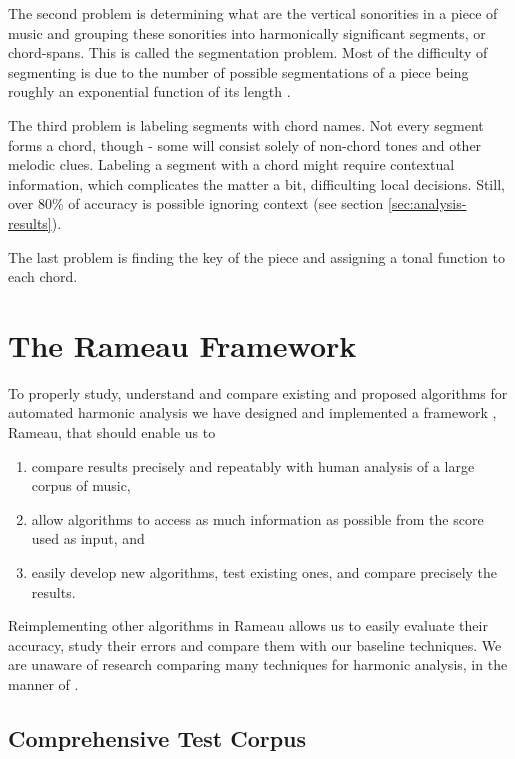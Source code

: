 \documentclass{article}
\begin{document}
The second problem is determining what are the vertical sonorities in
a piece of music and grouping these sonorities into harmonically
significant segments, or chord-spans. This is called the segmentation
problem. Most of the difficulty of segmenting is due to the number of
possible segmentations of a piece being roughly an exponential
function of its length \cite{pardo02:algorithms}.

The third problem is labeling segments with chord names. Not every
segment forms a chord, though - some will consist solely of non-chord
tones and other melodic clues. Labeling a segment with a chord might
require contextual information, which complicates the matter a bit,
difficulting local decisions. Still, over 80\% of accuracy is possible
ignoring context (see section \ref{sec:analysis-results}).

The last problem is finding the key of the piece and assigning a tonal
function to each chord.

\section{The Rameau Framework}
\label{sec:system}

To properly study, understand and compare existing and proposed
algorithms for automated harmonic analysis we have designed and
implemented a framework , Rameau, that should enable us to

\begin{enumerate}
\item compare results precisely and repeatably with human analysis of
  a large corpus of music,
\item allow algorithms to access as much information as possible from
  the score used as input, and
\item easily develop new algorithms, test existing ones, and compare
  precisely the results.
\end{enumerate}

Reimplementing other algorithms in Rameau allows us to easily evaluate
their accuracy, study their errors and compare them with our baseline
techniques. We are unaware of research comparing many techniques for
harmonic analysis, in the manner of \cite{gomez.herrera:tonality}.

\subsection{Comprehensive Test Corpus}
\label{sec:comprehensive-test-corpus}
\end{document}
